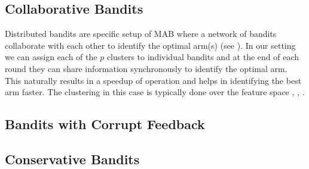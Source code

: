 \subsection{Collaborative Bandits}

Distributed bandits are specific setup of MAB where a network of bandits collaborate with each other to identify the optimal arm(s) (see \citet{awerbuch2008competitive,liu2010distributed,szorenyi2013gossip,hillel2013distributed}). In our setting we can assign each of the $p$ clusters to individual bandits and at the end of each round they can share information synchronously to identify the optimal arm. This naturally results in a speedup of operation and helps in identifying the best arm faster. The clustering in this case is typically done over the feature space \citet{bui2012clustered}, \citet{cesa2013gang}, \citet{gentile2014online}.

\subsection{Bandits with Corrupt Feedback}


\subsection{Conservative Bandits}